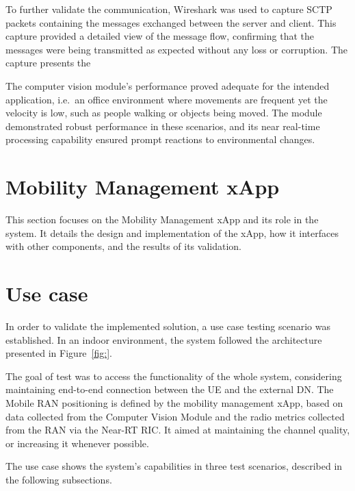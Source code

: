 To further validate the communication, Wireshark was used to capture SCTP packets containing the messages exchanged between the server and client.
This capture provided a detailed view of the message flow, confirming that the messages were being transmitted as expected without any loss or corruption.
The capture presents the





The computer vision module's performance proved adequate for the intended application, i.e.\ an office environment where movements are frequent yet the velocity is low, such as people walking or objects being moved.
The module demonstrated robust performance in these scenarios, and its near real-time processing capability ensured prompt reactions to environmental changes.



\section{Mobility Management xApp}\label{sec:mm_xapp}
This section focuses on the Mobility Management xApp and its role in the system.
It details the design and implementation of the xApp, how it interfaces with other components, and the results of its validation.

\section{Use case}\label{sec:use_case}
In order to validate the implemented solution, a use case testing scenario was established.
In an indoor environment, the system followed the architecture presented in Figure~\ref{fig:}.



The goal of test was to access the functionality of the whole system, considering maintaining end-to-end connection between the UE and the external DN. The Mobile RAN positioning is defined by the mobility management xApp, based on data collected from the Computer Vision Module and the radio metrics collected from the RAN via the Near-RT RIC. It aimed at maintaining the channel quality, or increasing it whenever possible.

The use case shows the system's capabilities in three test scenarios, described in the following subsections.

